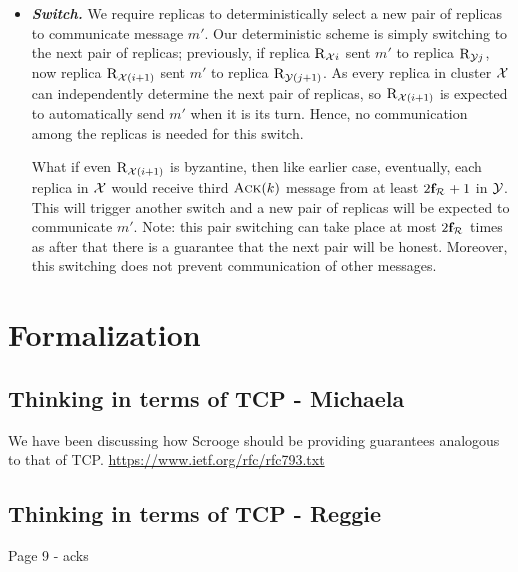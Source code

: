 \begin{itemize}[wide]
\item {\bf \em Switch.}
We require replicas to deterministically select a new pair of replicas to communicate message $m'$. 
Our deterministic scheme is simply switching to the next pair of replicas; 
previously, if replica $\textsc{R}_{{\mathcal{X}}{i}}$ sent $m'$ to replica $\textsc{R}_{{\mathcal{Y}}{j}}$, now 
replica $\textsc{R}_{{\mathcal{X}}{(i+1)}}$ sent $m'$ to replica $\textsc{R}_{{\mathcal{Y}}{(j+1)}}$.
As every replica in cluster $\mathcal{X}$ can independently determine the next pair of replicas, 
so $\textsc{R}_{{\mathcal{X}}{(i+1)}}$ is expected to automatically send $m'$ when it is its turn. 
Hence, no communication among the replicas is needed for this switch.

What if even $\textsc{R}_{{\mathcal{X}}{(i+1)}}$ is byzantine, then like earlier case, eventually, 
each replica in $\mathcal{X}$ would receive third $\textsc{Ack}(k)$ message from at least $2\textbf{f}_{\mathcal{R}_{\mathcal{}}}+1$ in $\mathcal{Y}$. 
This will trigger another switch and a new pair of replicas will be expected to communicate $m'$.
Note: this pair switching can take place at most $2\textbf{f}_{\mathcal{R}_{\mathcal{}}}$ times as after that there is 
a guarantee that the next pair will be honest.
Moreover, this switching does not prevent communication of other messages.



\end{itemize}


\section{Formalization}
\subsection{Thinking in terms of TCP - Michaela}
We have been discussing how Scrooge should be providing guarantees analogous to that of TCP. \href{RFC}{https://www.ietf.org/rfc/rfc793.txt}

\subsection{Thinking in terms of TCP - Reggie}

Page 9 - acks

